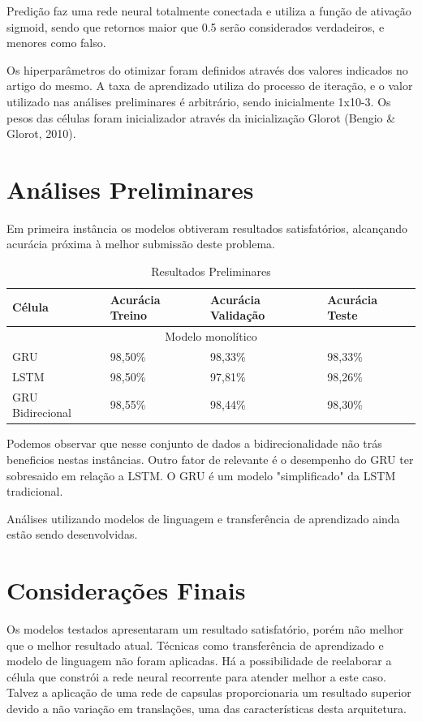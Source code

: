 \documentclass[12pt]{article}
\begin{document}
Predição faz uma rede neural totalmente conectada e utiliza a função de ativação sigmoid, sendo que retornos maior que 0.5 serão considerados verdadeiros, e menores como falso.

Os hiperparâmetros do otimizar foram definidos através dos valores indicados no artigo do mesmo. A taxa de aprendizado utiliza do processo de iteração, e o valor utilizado nas análises preliminares é arbitrário, sendo inicialmente 1x10-3. Os pesos das células foram inicializador através da inicialização Glorot (Bengio & Glorot, 2010).

\section{Análises Preliminares}

Em primeira instância os modelos obtiveram resultados satisfatórios, alcançando acurácia próxima à melhor submissão deste problema.

\begin{table}[t]
  \small
  \centering
  \renewcommand{\arraystretch}{1.15}
  \begin{tabular}{llll}
    \hline
     Célula & Acurácia Treino & Acurácia Validação & Acurácia Teste \\
    \hline
    \multicolumn{4}{c}{Modelo monolítico} \\
    \hline
    GRU & 98,50\% & 98,33\% & 98,33\% \\
    LSTM & 98,50\% & 97,81\% & 98,26\% \\
    GRU Bidirecional & 98,55\% & 98,44\% & 98,30\% \\
    \hline
  \end{tabular}
  \caption{Resultados Preliminares}
  \label{tab:ptb}
\end{table}


Podemos observar que nesse conjunto de dados a bidirecionalidade não trás beneficios nestas instâncias. Outro fator de relevante é o desempenho do GRU ter sobresaido em relação a LSTM. O GRU é um modelo "simplificado" da LSTM tradicional.

Análises utilizando modelos de linguagem e transferência de aprendizado ainda estão sendo desenvolvidas.

\section{Considerações Finais}

Os modelos testados apresentaram um resultado satisfatório, porém não melhor que o melhor resultado atual. Técnicas como transferência de aprendizado e modelo de linguagem não foram aplicadas. Há a possibilidade de reelaborar a célula que constrói a rede neural recorrente para atender melhor a este caso. Talvez a aplicação de uma rede de capsulas \cite{DBLP:journals/corr/abs-1710-09829} proporcionaria um resultado superior devido a não variação em translações, uma das características desta arquitetura. 



\end{document}

